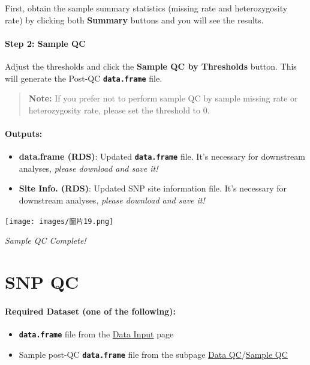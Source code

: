 \documentclass[
]{book}
\begin{document}
First, obtain the sample summary statistics (missing rate and heterozygosity rate) by clicking both {\textbf{Summary}} buttons and you will see the results.

\paragraph*{Step 2: Sample QC}\label{step-2-sample-qc}

Adjust the thresholds and click the {\textbf{Sample QC by Thresholds}} button. This will generate the Post-QC {\textbf{\texttt{data.frame}}} file.

\begin{quote}
\textbf{Note:} If you prefer not to perform sample QC by sample missing rate or heterozygosity rate, please set the threshold to 0.
\end{quote}

\paragraph*{Outputs:}\label{outputs-1}

\begin{itemize}
\item
  \textbf{data.frame (RDS)}: Updated {\textbf{\texttt{data.frame}}} file. It's necessary for downstream analyses, \emph{please download and save it!}
\item
  \textbf{Site Info. (RDS)}: Updated SNP site information file. It's necessary for downstream analyses, \emph{please download and save it!}
\end{itemize}

\texttt{[image: images/圖片19.png]}

\emph{Sample QC Complete!}

\section{SNP QC}\label{snp-qc}

\paragraph*{Required Dataset (one of the following):}\label{required-dataset-one-of-the-following-2}

\begin{itemize}
\item
  {\textbf{\texttt{data.frame}}} file from the \ul{Data Input} page
\item
  Sample post-QC {\textbf{\texttt{data.frame}}} file from the subpage \ul{Data QC}/\ul{Sample QC}
\end{itemize}
\end{document}
